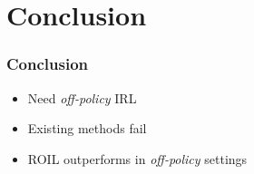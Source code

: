\documentclass{beamer}
\begin{document}




\section*{Conclusion}

\begin{frame}
	\frametitle{Conclusion}
	\begin{itemize}
    \item Need \emph{off-policy} IRL
    \vfill
    \item Existing methods fail
    \vfill
		\item ROIL outperforms in \emph{off-policy} settings
	\end{itemize}
\end{frame}
\end{document}
